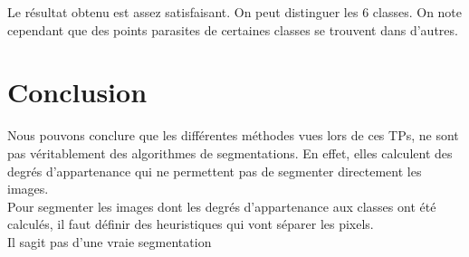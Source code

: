 \documentclass[a4paper,11pt]{article}
\begin{document}
Le résultat obtenu est assez satisfaisant. On peut distinguer les 6 classes. On note cependant que des points parasites de certaines classes se trouvent dans d'autres.

\clearpage

\section{Conclusion}
Nous pouvons conclure que les différentes méthodes vues lors de ces TPs, 
ne sont pas véritablement des algorithmes de segmentations. En effet, 
elles calculent des degrés d'appartenance qui ne permettent pas de 
segmenter directement les images.\\

Pour segmenter les images dont les degrés d'appartenance aux classes ont 
été calculés, il faut définir des heuristiques qui vont séparer les 
pixels.\\

Il sagit pas d'une vraie segmentation
\end{document}
